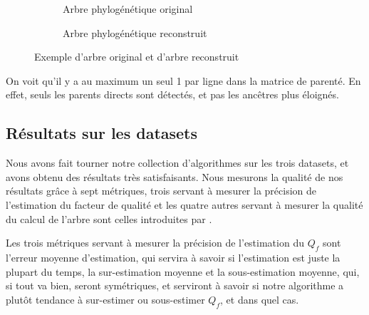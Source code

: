\documentclass[utf8,final]{stageM2R} %
\begin{document}
\begin{figure}[H]
  \begin{subfigure}{.5\textwidth}
    \centering
    \caption{Arbre phylogénétique original}
  \end{subfigure}
  \begin{subfigure}{.5\textwidth}
    \centering
    \caption{Arbre phylogénétique reconstruit}
  \end{subfigure}
  \caption{Exemple d'arbre original et d'arbre reconstruit}
  \label{tree_example}
\end{figure}

On voit qu'il y a au maximum un seul 1 par ligne dans la matrice de parenté. En effet, seuls les parents directs sont détectés, et pas les ancêtres plus éloignés.
\subsection{Résultats sur les datasets}
Nous avons fait tourner notre collection d'algorithmes sur les trois datasets, et avons obtenu des résultats très satisfaisants. Nous mesurons la qualité de nos résultats grâce à sept métriques, trois servant à mesurer la précision de l'estimation du facteur de qualité et les quatre autres servant à mesurer la qualité du calcul de l'arbre sont celles introduites par  \cite{dias2012image}.

Les trois métriques servant à mesurer la précision de l'estimation du $Q_f$ sont l'erreur moyenne d'estimation, qui servira à savoir si l'estimation est juste la plupart du temps, la sur-estimation moyenne et la sous-estimation moyenne, qui, si tout va bien, seront symétriques, et serviront à savoir si notre algorithme a plutôt tendance à sur-estimer ou sous-estimer $Q_f$, et dans quel cas.
\end{document}
